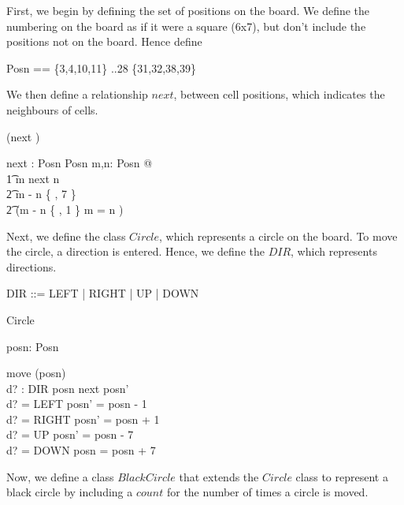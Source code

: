 \documentclass[11pt,a4paper]{article}
\begin{document}
\noindent

First, we begin by defining the set of positions on the board. We define
the numbering on the board as if it were a square (6x7), but don't include
the positions not on the board. Hence define
\begin{zed}
  Posn == \{3,4,10,11\} ..28 \cup \{31,32,38,39\}
\end{zed}

We then define a relationship $next$, between cell positions, which
indicates the neighbours of cells.
\begin{zed}
 \relation (\varg next \varg)
\end{zed}

\begin{axdef}
  \varg next \varg : Posn \rel Posn
\where
  \forall m,n: Posn @ \\
    \t1 m next n \iff \\
       \t2 m - n \in \{ , 7 \} \lor \\
       \t2 (m - n \in \{  , 1 \} \land m  = n )
\end{axdef}

Next, we define the class $Circle$, which represents a circle on the
board. To move the circle, a direction is entered. Hence, we define the
$DIR$, which represents directions.

\begin{zed}
  DIR ::= LEFT | RIGHT | UP | DOWN
\end{zed}

\begin{class}{Circle}
\also
\begin{state}
  posn: Posn
\end{state} 
\begin{schema}{move}
  \Delta(posn) \\
  d? : DIR
\where
  posn next posn' \\
  d? = LEFT \implies posn' = posn - 1 \\
  d? = RIGHT \implies posn' = posn + 1 \\
  d? = UP \implies posn' = posn - 7 \\
  d? = DOWN \implies posn = posn + 7 \\
\end{schema}
\end{class}

Now, we define a class $BlackCircle$ that extends the $Circle$ class to
represent a black circle by including a $count$ for the number of times a
circle is moved.
\end{document}
